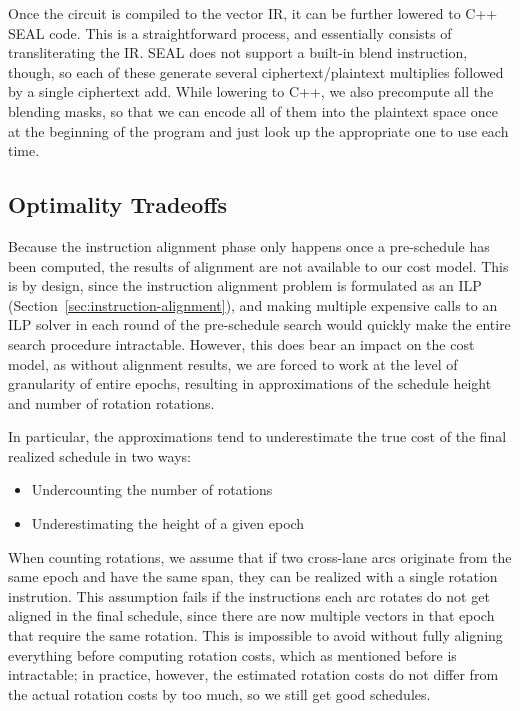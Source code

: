Once the circuit is compiled to the vector IR, it can be further lowered to C++ SEAL code.
This is a straightforward process, and essentially consists of transliterating the IR. 
SEAL does not support a built-in blend instruction, though, so each of these generate several ciphertext/plaintext multiplies followed by a single ciphertext add.
While lowering to C++, we also precompute all the blending masks, so that we can encode all of them into the plaintext space once at the beginning of the program and just look up the appropriate one to use each time.

\subsection{Optimality Tradeoffs}\label{sec:optimality-tradeoffs} 
Because the instruction alignment phase only happens once a pre-schedule has been computed, the results of alignment are not available to our cost model.
This is by design, since the instruction alignment problem is formulated as an ILP (Section~\ref{sec:instruction-alignment}), and making multiple expensive calls to an ILP solver in each round of the pre-schedule search would quickly make the entire search procedure intractable.
However, this does bear an impact on the cost model, as without alignment results, we are forced to work at the level of granularity of entire epochs, resulting in approximations of the schedule height and number of rotation rotations.

In particular, the approximations tend to underestimate the true cost of the final realized schedule in two ways:
\begin{itemize}
    \item Undercounting the number of rotations
    \item Underestimating the height of a given epoch
\end{itemize}

When counting rotations, we assume that if two cross-lane arcs originate from the same epoch and have the same span, they can be realized with a single rotation instrution.
This assumption fails if the instructions each arc rotates  do not get aligned in the final schedule, since there are now multiple vectors in that epoch that require the same rotation.
This is impossible to avoid without fully aligning everything before computing rotation costs, which as mentioned before is intractable; in practice, however, the estimated rotation costs do not differ from the actual rotation costs by too much, so we still get good schedules. 

